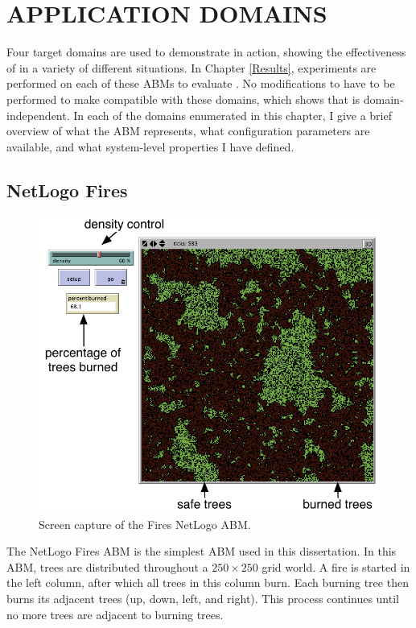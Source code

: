 \chapter{APPLICATION DOMAINS}
\thispagestyle{plain}

\label{Domains}


Four target domains are used to demonstrate \fw in action,  showing the effectiveness of \fw in a variety of different situations.
In Chapter \ref{Results}, experiments are performed on each of these ABMs to evaluate \fw.
No modifications to \fw have to be performed to make \fw compatible with these domains, which shows that \fw is domain-independent.
In each of the domains enumerated in this chapter, I give a brief overview of what the ABM represents, what configuration parameters are available, and what system-level properties I have defined.

\section{NetLogo Fires}\label{sec:Fires}

\begin{figure}[ht]
\centering
\includegraphics[scale=1]{images/fires_ui.pdf}
\caption{Screen capture of the Fires NetLogo ABM.}
\label{fig:firesui}
\end{figure}

The NetLogo Fires ABM is the simplest ABM used in this dissertation.
In this ABM, trees are distributed throughout a $250 \times 250$ grid world.
A fire is started in the left column, after which all trees in this column burn.
Each burning tree then burns its adjacent trees (up, down, left, and right).
This process continues until no more trees are adjacent to burning trees.

